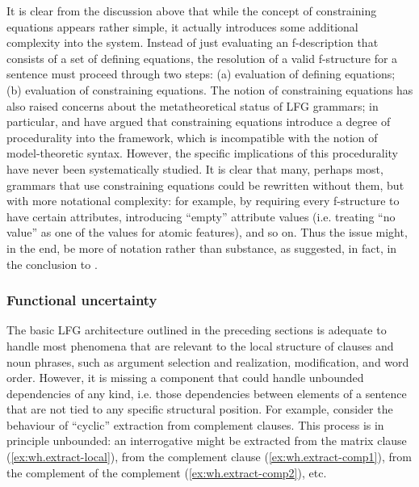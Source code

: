 \documentclass[output=paper,hidelinks]{langscibook}
\begin{document}
 It is clear from the discussion above that while the concept of constraining equations appears rather simple, it actually introduces some additional complexity into the system. Instead of just evaluating an f-description that consists of a set of defining equations, the resolution of a valid f-structure for a sentence must proceed through two steps: (a) evaluation of defining equations; (b) evaluation of constraining equations. The notion of constraining equations has also raised concerns about the metatheoretical status of LFG grammars; in particular, \textcite{pullum2013central} and \textcite{blackburn1995a-specification} have argued that constraining equations introduce a degree of procedurality into the framework, which is incompatible with the notion of model-theoretic syntax. However, the specific implications of this procedurality have never been systematically studied. It is clear that many, perhaps most, grammars that use constraining equations could be rewritten without them, but with more notational complexity: for example, by requiring every f-structure to have certain attributes, introducing ``empty'' attribute values (i.e. treating ``no value'' as one of the values for atomic features), and so on. Thus the issue might, in the end, be more of notation rather than substance, as suggested, in fact, in the conclusion to \textcite{blackburn1995a-specification}. 
 
 \subsubsection{Functional uncertainty\label{sect:fu}}

 The basic LFG architecture outlined in the preceding sections is adequate to handle most phenomena that are relevant to the local structure of clauses and noun phrases, such as argument selection and realization, modification, and word order. However, it is missing a component that could handle unbounded dependencies of any kind, i.e. those dependencies between elements of a sentence that are not tied to any specific structural position. For example, consider the behaviour of ``cyclic'' extraction from complement clauses. This process is in principle unbounded: an interrogative might be extracted from the matrix clause (\ref{ex:wh.extract-local}), from the complement clause (\ref{ex:wh.extract-comp1}), from the complement of the complement (\ref{ex:wh.extract-comp2}), etc.
 
\end{document}
